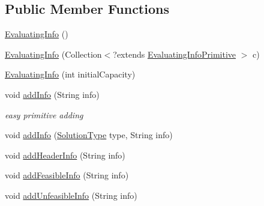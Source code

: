 \subsection*{Public Member Functions}
\begin{DoxyCompactItemize}
\item 
\hyperlink{classit_1_1emarolab_1_1cagg_1_1core_1_1evaluation_1_1interfacing_1_1GuiEvaluationInterface_1_1EvaluatingInfo_a56a0d6ed5912b2ab6e759e48b8d3701b}{Evaluating\-Info} ()
\item 
\hyperlink{classit_1_1emarolab_1_1cagg_1_1core_1_1evaluation_1_1interfacing_1_1GuiEvaluationInterface_1_1EvaluatingInfo_a8b7cd5d5f3001f617c3fcb34f9618b50}{Evaluating\-Info} (Collection$<$?extends \hyperlink{classit_1_1emarolab_1_1cagg_1_1core_1_1evaluation_1_1interfacing_1_1GuiEvaluationInterface_1_1EvaluatingInfoPrimitive}{Evaluating\-Info\-Primitive} $>$ c)
\item 
\hyperlink{classit_1_1emarolab_1_1cagg_1_1core_1_1evaluation_1_1interfacing_1_1GuiEvaluationInterface_1_1EvaluatingInfo_a5d506b7357c432a77790db1c59318b2f}{Evaluating\-Info} (int initial\-Capacity)
\item 
void \hyperlink{classit_1_1emarolab_1_1cagg_1_1core_1_1evaluation_1_1interfacing_1_1GuiEvaluationInterface_1_1EvaluatingInfo_a8d95202ea6fd4ac5ccdc62b1d06917ae}{add\-Info} (String info)
\begin{DoxyCompactList}\small\item\em easy primitive adding \end{DoxyCompactList}\item 
void \hyperlink{classit_1_1emarolab_1_1cagg_1_1core_1_1evaluation_1_1interfacing_1_1GuiEvaluationInterface_1_1EvaluatingInfo_aa008d540ae25956c19dddadd7718bb2f}{add\-Info} (\hyperlink{enumit_1_1emarolab_1_1cagg_1_1core_1_1evaluation_1_1interfacing_1_1GuiEvaluationInterface_1_1SolutionType}{Solution\-Type} type, String info)
\item 
void \hyperlink{classit_1_1emarolab_1_1cagg_1_1core_1_1evaluation_1_1interfacing_1_1GuiEvaluationInterface_1_1EvaluatingInfo_ae33a6dfbec04e8b7b50c7376fc40a2f8}{add\-Header\-Info} (String info)
\item 
void \hyperlink{classit_1_1emarolab_1_1cagg_1_1core_1_1evaluation_1_1interfacing_1_1GuiEvaluationInterface_1_1EvaluatingInfo_a5bfaae79d2c44a56e499a9fbe0fd1cab}{add\-Feasible\-Info} (String info)
\item 
void \hyperlink{classit_1_1emarolab_1_1cagg_1_1core_1_1evaluation_1_1interfacing_1_1GuiEvaluationInterface_1_1EvaluatingInfo_acd05a9c0588a313c2279c7808ed45cfb}{add\-Unfeasible\-Info} (String info)

\end{DoxyCompactItemize}
